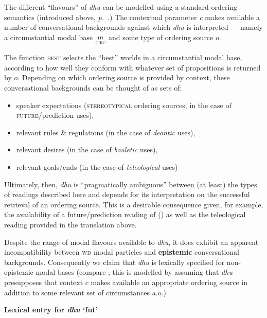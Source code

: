 The different ``flavours'' of \textit{dhu} can be modelled using a standard ordering semantics (introduced above, \textit{p.}~\pageref{ex:randi}.) The contextual parameter \textit{c} makes available a number of conversational backgrounds against which \textit{dhu} is interpreted --- namely a circumstantial modal base $ \underset{\textsc{circ}}{m} $ and some type of ordering source $ o $. 

The function \textsc{best} selects the ``best'' worlds in a circumstantial modal base, according to how well they conform with whatever set of propositions is returned by $ o $. Depending on which ordering source is provided by context, these conversational backgrounds can be thought of as sets of:
\begin{itemize}
	\item speaker expectations (\textsc{stereotypical} ordering sources, in the case of \textsc{future}/prediction uses), 
	\item relevant rules \& regulations (in the case of \textit{deontic} uses),
	\item  relevant desires (in the case of \textit{bouletic} uses),
	\item  relevant goals/ends (in the case of \textit{teleological} uses) 
\end{itemize}	
	
\noindent Ultimately, then, \textit{dhu} is ``pragmatically ambiguous'' between (at least) the types of readings described here and depends for its interpretation on the successful retrieval of an ordering source. This is a desirable consequence given, for example, the availability of a future/prediction reading of () as well as the teleological reading provided in the translation above.
	
	
Despite the range of modal flavours available to \textit{dhu}, it does exhibit an apparent incompatibility between \textsc{wd} modal particles and \textbf{epistemic} conversational backgrounds. Consequently we claim that \textit{dhu} is lexically specified for non-epistemic modal bases (compare \citet{Kratzer1981}; this is modelled by assuming that \textit{dhu} presupposes that context $ c $ makes available an appropriate ordering source in addition to some relevant set of circumstances \citealp[see also][]{Peterson2010,Rullmann2008,Matthewson2016} a.o.)



\pex \textbf{Lexical entry for \textit{dhu} `\gls{fut}'}

